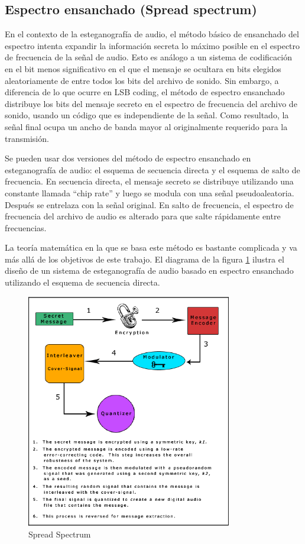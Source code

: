 \documentclass[12pt]{article}
\begin{document}
\subsection{Espectro ensanchado (Spread spectrum)}

En el contexto de la esteganografía de audio, el método básico de ensanchado del espectro intenta expandir la información secreta lo máximo posible en el espectro de frecuencia de la señal de audio. Esto es análogo a un sistema de codificación en el bit menos significativo en el que el mensaje se ocultara en bits elegidos aleatoriamente de entre todos los bits del archivo de sonido. Sin embargo, a diferencia de lo que ocurre en LSB coding, el método de espectro ensanchado distribuye los bits del mensaje secreto en el espectro de frecuencia del archivo de sonido, usando un código que es independiente de la señal. Como resultado, la señal final ocupa un ancho de banda mayor al originalmente requerido para la transmisión.

Se pueden usar dos versiones del método de espectro ensanchado en esteganografía de audio: el esquema de secuencia directa y el esquema de salto de frecuencia. En secuencia directa, el mensaje secreto se distribuye utilizando una constante llamada ``chip rate'' y luego se modula con una señal pseudoaleatoria. Después se entrelaza con la señal original. En salto de frecuencia, el espectro de frecuencia del archivo de audio es alterado para que salte rápidamente entre frecuencias.

La teoría matemática en la que se basa este método es bastante complicada y va más allá de los objetivos de este trabajo. El diagrama de la figura \ref{spreadspectrum} ilustra el diseño de un sistema de esteganografía de audio basado en espectro ensanchado utilizando el esquema de secuencia directa.

\begin{figure}
  \centering
    \includegraphics[width=0.8\textwidth]{img/spreadspectrum}
  \caption{Spread Spectrum}
  \label{spreadspectrum}
\end{figure}
\end{document}
